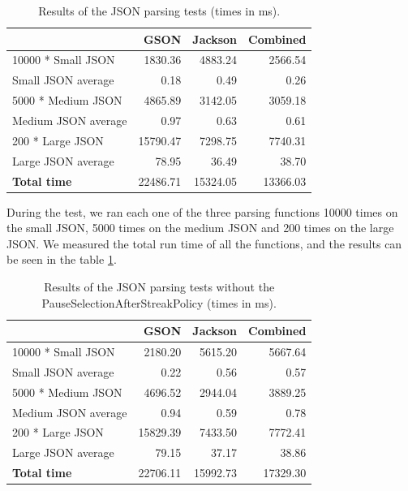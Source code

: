 \begin{table}[h!]
	\captionsetup{justification=centering,margin=0.5cm}
	\bgroup
	\def\arraystretch{1.5}%
	\begin{center}
		\begin{tabular}{ | l | r | r | r | }
			\hline
			& \textbf{GSON} & \textbf{Jackson} & \textbf{Combined} \\ \hline
			10000 * Small JSON & 1830.36 & 4883.24 & 2566.54 \\ \hline	
			Small JSON average & 0.18 & 0.49 & 0.26 \\ \hline	
			5000 * Medium JSON & 4865.89 & 3142.05 & 3059.18 \\ \hline	
			Medium JSON average & 0.97 & 0.63 & 0.61 \\ \hline	
			200 * Large JSON & 15790.47 & 7298.75 & 7740.31 \\ \hline	
			Large JSON average & 78.95 & 36.49 & 38.70 \\ \hline
			\textbf{Total time} & 22486.71 & 15324.05 & 13366.03 \\
			\hline
		\end{tabular}
	\end{center}
	\egroup
	\caption{Results of the JSON parsing tests (times in ms).}
	\label{tab:json_parsing_results}
\end{table}


During the test, we ran each one of the three parsing functions 10000 times on the small JSON, 5000 times on the medium JSON and 200 times on the large JSON. We measured the total run time of all the functions, and the results can be seen in the table \ref{tab:json_parsing_results}.

\begin{table}[h!]
	\captionsetup{justification=centering,margin=0.5cm}
	\bgroup
	\def\arraystretch{1.5}%
	\begin{center}
		\begin{tabular}{ | l | r | r | r | }
			\hline
			& \textbf{GSON} & \textbf{Jackson} & \textbf{Combined} \\ \hline
			10000 * Small JSON  & 2180.20       & 5615.20          & 5667.64           \\ \hline
			Small JSON average  & 0.22          & 0.56             & 0.57              \\ \hline
			5000 * Medium JSON  & 4696.52       & 2944.04          & 3889.25           \\ \hline
			Medium JSON average & 0.94          & 0.59             & 0.78              \\ \hline
			200 * Large JSON    & 15829.39      & 7433.50          & 7772.41           \\ \hline
			Large JSON average  & 79.15         & 37.17            & 38.86             \\ \hline
			\textbf{Total time}          & 22706.11      & 15992.73         & 17329.30          \\ \hline
		\end{tabular}
	\end{center}
	\egroup
	\caption{Results of the JSON parsing tests without the PauseSelectionAfterStreakPolicy (times in ms).}
	\label{tab:json_parsing_results_no_policy}
\end{table}

